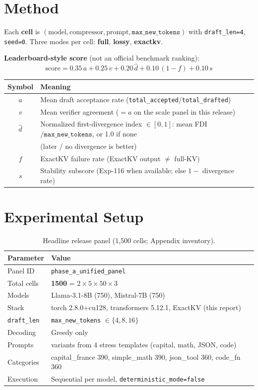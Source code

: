 \documentclass[11pt]{article}
\begin{document}
\section{Method}
Each \textbf{cell} is $(\text{model}, \text{compressor}, \text{prompt},
\texttt{max\_new\_tokens})$ with \texttt{draft\_len=4}, \texttt{seed=0}. Three
modes per cell: \textbf{full}, \textbf{lossy}, \textbf{exactkv}.

\noindent\textbf{Leaderboard-style score} (not an official benchmark ranking):
\[
\text{score} = 0.35\,a + 0.25\,v + 0.20\,\hat{d} + 0.10\,(1-f) + 0.10\,s
\]
\begin{center}
\small
\begin{tabular}{cl}
\toprule
\textbf{Symbol} & \textbf{Meaning} \\
\midrule
$a$ & Mean draft acceptance rate (\texttt{total\_accepted}/\texttt{total\_drafted}) \\
$v$ & Mean verifier agreement ($=a$ on the scale panel in this release) \\
$\hat{d}$ & Normalized first-divergence index $\in[0,1]$: mean FDI$/\texttt{max\_new\_tokens}$, or 1.0 if none \\
 & (later / no divergence is better) \\
$f$ & ExactKV failure rate (ExactKV output $\neq$ full-KV) \\
$s$ & Stability subscore (Exp-116 when available; else $1-$ divergence rate) \\
\bottomrule
\end{tabular}
\end{center}

\section{Experimental Setup}
\begin{table}[htbp]
\centering\small
\caption{Headline release panel (1,500 cells; Appendix inventory).}
\label{tab:experimental-setup}
\begin{tabularx}{\textwidth}{@{}>{\raggedright\arraybackslash}p{}>{\raggedright\arraybackslash}X@{}}
\toprule
\textbf{Parameter} & \textbf{Value} \\ \midrule
Panel ID & \texttt{phase\_a\_unified\_panel} \\
Total cells & \textbf{1500} = $2 \times 5 \times 50 \times 3$ \\
Models & Llama-3.1-8B (750), Mistral-7B (750) \\
Stack & torch 2.8.0+cu128, transformers 5.12.1, ExactKV (this report) \\
\texttt{draft\_len} & 4 \quad \texttt{max\_new\_tokens} $\in \{4,8,16\}$ \\
Decoding & Greedy only \\
Prompts & 50 variants from 4 stress templates (capital, math, JSON, code) \\
Categories & capital\_france 390, simple\_math 390, json\_tool 360, code\_fn 360 \\
Execution & Sequential per model, \texttt{deterministic\_mode=false} \\
\bottomrule
\end{tabularx}
\end{table}
\end{document}
